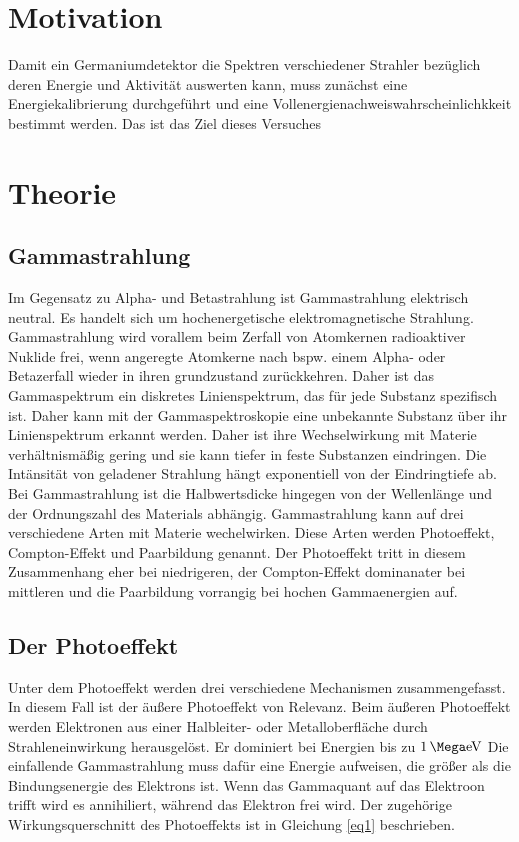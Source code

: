 \section{Motivation}
Damit ein Germaniumdetektor die Spektren verschiedener Strahler bezüglich deren
Energie und Aktivität auswerten kann, muss zunächst eine Energiekalibrierung 
durchgeführt und
eine Vollenergienachweiswahrscheinlichkkeit bestimmt werden. 
Das ist das Ziel dieses Versuches

\section{Theorie}
\label{sec:Theorie}

\subsection{Gammastrahlung}
Im Gegensatz zu Alpha- und Betastrahlung ist Gammastrahlung elektrisch neutral. 
Es handelt sich um hochenergetische elektromagnetische Strahlung.
Gammastrahlung wird vorallem beim Zerfall von Atomkernen radioaktiver Nuklide frei, 
wenn angeregte Atomkerne nach bspw. einem Alpha- oder Betazerfall wieder in ihren 
grundzustand zurückkehren.
Daher ist das Gammaspektrum ein diskretes Linienspektrum, das für jede Substanz 
spezifisch ist. Daher kann mit der Gammaspektroskopie eine unbekannte Substanz über 
ihr Linienspektrum erkannt werden.
Daher ist ihre Wechselwirkung mit Materie verhältnismäßig gering und sie 
kann tiefer in feste Substanzen eindringen.
Die Intänsität von geladener Strahlung hängt exponentiell von der 
Eindringtiefe ab. Bei Gammastrahlung ist die Halbwertsdicke hingegen 
von der Wellenlänge und der Ordnungszahl des Materials abhängig.
Gammastrahlung kann auf drei verschiedene Arten mit Materie wechelwirken.
Diese Arten werden Photoeffekt, Compton-Effekt und Paarbildung genannt.
Der Photoeffekt tritt in diesem Zusammenhang eher bei niedrigeren, der 
Compton-Effekt dominanater bei mittleren und die Paarbildung vorrangig
bei hochen Gammaenergien auf.

\subsection{Der Photoeffekt}
Unter dem Photoeffekt werden drei verschiedene Mechanismen zusammengefasst.
In diesem Fall ist der äußere Photoeffekt von Relevanz.
Beim äußeren Photoeffekt werden Elektronen aus einer Halbleiter- oder Metalloberfläche 
durch Strahleneinwirkung herausgelöst. 
Er dominiert bei Energien bis zu $\SI{1}{\Mega\electronvolt}$
Die einfallende Gammastrahlung muss dafür eine Energie aufweisen, die größer als die 
Bindungsenergie des Elektrons ist. Wenn das Gammaquant auf das Elektroon trifft wird es 
annihiliert, während das Elektron frei wird. Der zugehörige 
Wirkungsquerschnitt des Photoeffekts ist in Gleichung \ref{eq1} beschrieben.

